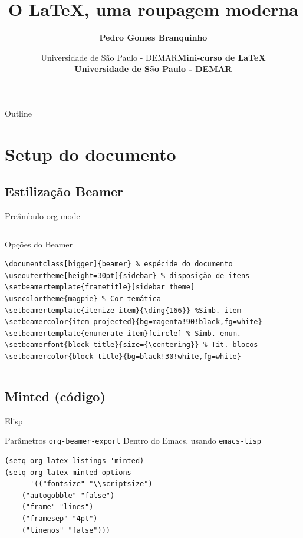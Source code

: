 \documentclass[bigger]{beamer}
\date{  Universidade de São Paulo - DEMAR}
\title{O \LaTeX{}, uma roupagem moderna}
\author[Branquinho]{\textbf{Pedro Gomes Branquinho \\ \text{\scriptsize{pedro.branquinho@usp.br}}}}
\date[EEL-USP]{\textbf{\scriptsize{Mini-curso de \LaTeX} \\ Universidade de São Paulo - DEMAR}}
\begin{document}
\maketitle
\begin{frame}{Outline}
\tableofcontents
\end{frame}



\section{Setup do documento}
\label{sec:orge3e4a2a}
{
\subsection{Estilização Beamer}
\label{sec:org9624a9b}
\begin{frame}[label={sec:org69aa734},fragile]{Preâmbulo org-mode}
 \begin{columns}
\begin{column}{0.92\columnwidth}
\begin{block}{Opções do Beamer}
\begin{verbatim}
\documentclass[bigger]{beamer} % espécide do documento
\useoutertheme[height=30pt]{sidebar} % disposição de itens
\setbeamertemplate{frametitle}[sidebar theme]
\usecolortheme{magpie} % Cor temática
\setbeamertemplate{itemize item}{\ding{166}} %Simb. item
\setbeamercolor{item projected}{bg=magenta!90!black,fg=white}
\setbeamertemplate{enumerate item}[circle] % Simb. enum.
\setbeamerfont{block title}{size={\centering}} % Tit. blocos
\setbeamercolor{block title}{bg=black!30!white,fg=white}
\end{verbatim}
\end{block}
\end{column}
\end{columns}
\end{frame}

\subsection{Minted (código)}
\label{sec:org4890997}
\begin{frame}[label={sec:org2357977},fragile]{Elisp}
 \begin{block}{Parâmetros \texttt{org-beamer-export}}
Dentro do Emacs, usando \texttt{emacs-lisp}
\begin{verbatim}
(setq org-latex-listings 'minted)
(setq org-latex-minted-options
      '(("fontsize" "\\scriptsize")
	("autogobble" "false")
	("frame" "lines")
	("framesep" "4pt")
	("linenos" "false")))
\end{verbatim}
\end{block}
\end{frame}

}
\end{document}
